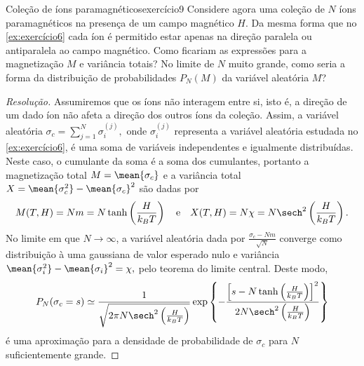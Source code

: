 \begin{exercício}{Coleção de íons paramagnéticos}{exercício9}
    Considere agora uma coleção de \(N\) íons paramagnéticos na presença de um campo magnético \(H\). Da mesma forma que no \cref{ex:exercício6} cada íon é permitido estar apenas na direção paralela ou antiparalela ao campo magnético. Como ficariam as expressões para a magnetização \(M\) e variância totais? No limite de \(N\) muito grande, como seria a forma da distribuição de probabilidades \(P_N(M)\) da variável aleatória \(M\)?
\end{exercício}
\begin{proof}[Resolução]
    Assumiremos que os íons não interagem entre si, isto é, a direção de um dado íon não afeta a direção dos outros íons da coleção. Assim, a variável aleatória \(\sigma_c = \sum_{j = 1}^N \sigma_{i}^{(j)},\) onde \(\sigma_{i}^{(j)}\) representa a variável aleatória estudada no \cref{ex:exercício6}, é uma soma de variáveis independentes e igualmente distribuídas. Neste caso, o cumulante da soma é a soma dos cumulantes, portanto a magnetização total \(M = \mean{\sigma_c}\) e a variância total \(X = \mean{\sigma_c^2} - \mean{\sigma_c}^2\) são dadas por
    \begin{equation*}
        M(T, H) = Nm = N \tanh\left(\frac{H}{k_BT}\right)
        \quad\text{e}\quad
        X(T, H) = N \chi = N \sech^2\left(\frac{H}{k_B T}\right).
    \end{equation*}
    No limite em que \(N \to \infty\), a variável aleatória dada por \(\frac{\sigma_c - Nm}{\sqrt{N}}\) converge como distribuição à uma gaussiana de valor esperado nulo e variância \(\mean{\sigma_i^2} - \mean{\sigma_i}^2 = \chi,\) pelo teorema do limite central. Deste modo,
    \begin{equation*}
        P_N(\sigma_c = s) \simeq \frac{1}{\sqrt{2\pi N \sech^2\left(\frac{H}{k_B T}\right)}} \exp\left\{-\frac{\left[s - N\tanh\left(\frac{H}{k_BT}\right)\right]^2}{2N \sech^2\left(\frac{H}{k_B T}\right)}\right\}
    \end{equation*}
    é uma aproximação para a densidade de probabilidade de \(\sigma_c\) para \(N\) suficientemente grande.
\end{proof}
